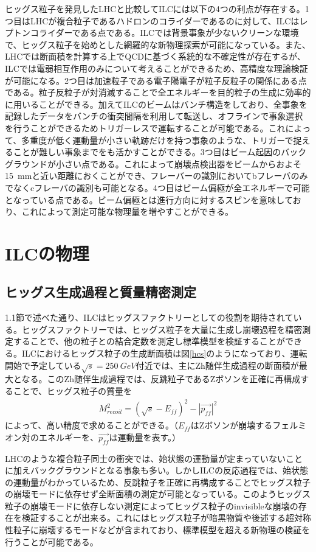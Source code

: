 ヒッグス粒子を発見したLHCと比較してILCには以下の4つの利点が存在する。1つ目はLHCが複合粒子であるハドロンのコライダーであるのに対して、ILCはレプトンコライダーである点である。ILCでは背景事象が少ないクリーンな環境で、ヒッグス粒子を始めとした網羅的な新物理探索が可能になっている。また、LHCでは断面積を計算する上でQCDに基づく系統的な不確定性が存在するが、ILCでは電弱相互作用のみについて考えることができるため、高精度な理論検証が可能になる。2つ目は加速粒子である電子陽電子が粒子反粒子の関係にある点である。粒子反粒子が対消滅することで全エネルギーを目的粒子の生成に効率的に用いることができる。加えてILCのビームはバンチ構造をしており、全事象を記録したデータをバンチの衝突間隔を利用して転送し、オフラインで事象選択を行うことができるためトリガーレスで運転することが可能である。これによって、多重度が低く運動量が小さい軌跡だけを持つ事象のような、トリガーで捉えることが難しい事象までをも活かすことができる。3つ目はビーム起因のバックグラウンドが小さい点である。これによって崩壊点検出器をビームからおよそ\SI{15}{mm}と近い距離におくことができ、フレーバーの識別においてbフレーバのみでなくcフレーバの識別も可能となる。4つ目はビーム偏極が全エネルギーで可能となっている点である。ビーム偏極とは進行方向に対するスピンを意味しており、これによって測定可能な物理量を増やすことができる。
\section{ILCの物理}
\subsection{ヒッグス生成過程と質量精密測定}
1.1節で述べた通り、ILCはヒッグスファクトリーとしての役割を期待されている。ヒッグスファクトリーでは、ヒッグス粒子を大量に生成し崩壊過程を精密測定することで、他の粒子との結合定数を測定し標準模型を検証することができる。ILCにおけるヒッグス粒子の生成断面積は図\ref{hcs}のようになっており、運転開始で予定している$\sqrt{s}=\SI{250}{GeV}$付近では、主にZh随伴生成過程の断面積が最大となる。このZh随伴生成過程では、反跳粒子であるZボソンを正確に再構成することで、ヒッグス粒子の質量を
\begin{align}
\label{recoil}
M_{recoil}^2 = {( \sqrt{s} - E_{ff} )}^2 - {|\vec{p_{ff}}|}^2
\end{align}
によって、高い精度で求めることができる。（$E_{ff}$はZボソンが崩壊するフェルミオン対のエネルギーを、$\vec{p_{ff}}$は運動量を表す。）

LHCのような複合粒子同士の衝突では、始状態の運動量が定まっていないことに加えバックグラウンドとなる事象も多い。しかしILCの反応過程では、始状態の運動量がわかっているため、反跳粒子を正確に再構成することでヒッグス粒子の崩壊モードに依存せず全断面積の測定が可能となっている。このようヒッグス粒子の崩壊モードに依存しない測定によってヒッグス粒子のinvisibleな崩壊の存在を検証することが出来る。これにはヒッグス粒子が暗黒物質や後述する超対称性粒子に崩壊するモードなどが含まれており、標準模型を超える新物理の検証を行うことが可能である。

